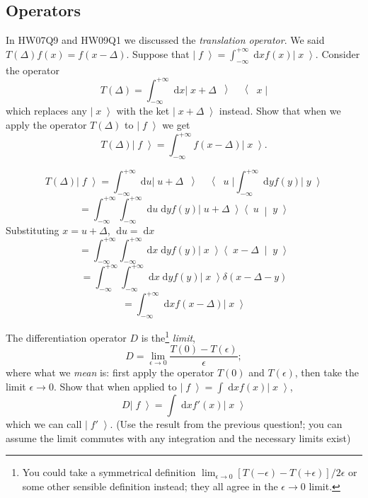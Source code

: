 \documentclass[answers]{exam}\newcommand{\repositoryInformationSetup}{     \usepackage[dvipsnames]{xcolor}     \usepackage[ angle=90, color=black, opacity=1, scale=2, ]{background}      \SetBgPosition{current page.west}      \SetBgVshift{-4.5mm}      \backgroundsetup{contents={{\color{green}\texttt{-{}-} differs from commit \texttt{aac605f} in 0 files}}} } \newcommand{\commit}{{{\color{green}aac605f}}}\usepackage{amsmath}
\newcommand{\goesto}{\ensuremath{\rightarrow}}
\providecommand{\id}{}
\renewcommand{\id}[1]{\ensuremath{\; \mathrm{d}#1}}
\newcommand{\ket}[1]{\ensuremath{\left|\;#1\;\right\rangle}}
\newcommand{\bracket}[2]{\ensuremath{\left\langle\;#1\;\middle|\;#2\;\right\rangle}}
\let\braket\bracket
\newcommand{\operator}[3]{\ensuremath{\left|\;#1\;\middle\rangle\; #2\; \middle\langle\;#3\;\right|}}
\begin{document}
\begin{questions}
	\section*{Operators}
	\question In HW07Q9 and HW09Q1 we discussed the \emph{translation operator}.  We said $T(\Delta) f(x) = f(x-\Delta)$.
	Suppose that $\ket{f} = \int_{-\infty}^{+\infty} \id{x} f(x) \ket{x}$.
	Consider the operator
	\begin{equation}
		T(\Delta) = \int_{-\infty}^{+\infty} \id{x} \operator{x+\Delta}{}{x}
	\end{equation}
	which replaces any \ket{x} with the ket $\ket{x+\Delta}$ instead.
	Show that when we apply the operator $T(\Delta)$ to \ket{f} we get
	\begin{equation}
		T(\Delta)\ket{f} = \int_{-\infty}^{+\infty} f(x-\Delta) \ket{x}.
	\end{equation}

	\begin{solution}
		$$T(\Delta)\ket{f} =   \int_{-\infty}^{+\infty} \id{u} \operator{u+\Delta}{}{u}  \int_{-\infty}^{+\infty} \id{y} f(y) \ket{y}$$
		$$ = \int_{-\infty}^{+\infty} \int_{-\infty}^{+\infty} \id{u} \id{y} f(y)  \ket{u+\Delta}   \braket{u}{y}$$
		Substituting $x = u + \Delta$, $\id{u} = \id{x}$
		$$ = \int_{-\infty}^{+\infty} \int_{-\infty}^{+\infty} \id{x} \id{y} f(y)  \ket{x}   \braket{x-\Delta}{y}$$
		$$ = \int_{-\infty}^{+\infty} \int_{-\infty}^{+\infty} \id{x} \id{y} f(y)  \ket{x}   \delta(x-\Delta-y)$$
		$$ = \int_{-\infty}^{+\infty} \id{x} f(x-\Delta)  \ket{x} $$

	\end{solution}

	\question The differentiation operator $D$ is the\footnote{You could take a symmetrical definition $\lim_{\epsilon\goesto0}[T(-\epsilon) - T(+\epsilon)]/2\epsilon$ or some other sensible definition instead; they all agree in the $\epsilon\goesto0$ limit.} \emph{limit},
	\begin{equation}
		D = \lim_{\epsilon\goesto0}\frac{T(0) - T(\epsilon)}{\epsilon};
	\end{equation}
	where what we \emph{mean} is: first apply the operator $T(0)$ and $T(\epsilon)$, then take the limit $\epsilon\goesto0$.
	Show that when applied to $\ket{f} = \int\id{x} f(x) \ket{x}$,
	\begin{equation}
		D\ket{f} = \int \id{x} f'(x) \ket{x}
	\end{equation}
	which we can call $\ket{f'}$.
	(Use the result from the previous question!; you can assume the limit commutes with any integration and the necessary limits exist)
	\begin{solution}


\end{solution}
\end{questions}
\end{document}
